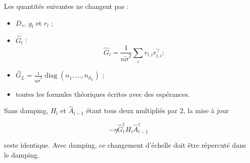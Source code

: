 Les quantités suivantes ne changent pas :

\begin{itemize}
    \item $D_v$, $g_l$ et $r_l$ ;

    \item $\widehat G_l$ :
    \[
    \widehat G_l
    =
    \frac{1}{n\widetilde\sigma^2}
    \sum_i r_{l,i}r_{l,i}^\top;
    \]

    \item $\widehat G_L=\frac{1}{n\widetilde\sigma^2}
    \operatorname{diag}(n_1,\ldots,n_{d_L})$ ;

    \item toutes les formules théoriques écrites avec des espérances.
\end{itemize}

Sans damping, $H_l$ et $\widehat A_{l-1}$ étant tous deux multipliés par $2$, la mise à jour

\[
-\eta\widehat G_l^\dagger H_l\widehat A_{l-1}^\dagger
\]

reste identique. Avec damping, ce changement d’échelle doit être répercuté dans le damping.
